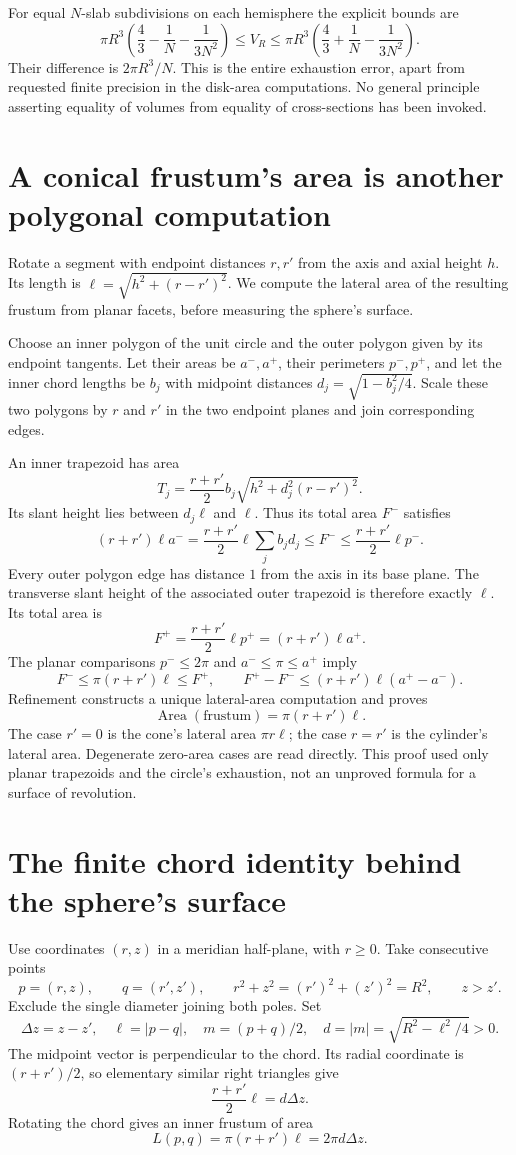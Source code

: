 For equal $N$-slab subdivisions on each hemisphere the explicit bounds are
\[
 \pi R^3\left(\frac43-\frac1N-\frac1{3N^2}\right)
 \le V_R\le
 \pi R^3\left(\frac43+\frac1N-\frac1{3N^2}\right).
\]
Their difference is $2\pi R^3/N$.  This is the entire exhaustion error,
apart from requested finite precision in the disk-area computations.
No general principle asserting equality of volumes from equality of
cross-sections has been invoked.

\section{A conical frustum's area is another polygonal computation}
\label{lem:frustum-area}
Rotate a segment with endpoint distances $r,r'$ from the axis and axial
height $h$.  Its length is $\ell=\sqrt{h^2+(r-r')^2}$.
We compute the lateral area of the resulting frustum from planar facets,
before measuring the sphere's surface.

Choose an inner polygon of the unit circle and the outer polygon given by
its endpoint tangents.  Let their areas be $a^-,a^+$, their perimeters
$p^-,p^+$, and let the inner chord lengths be $b_j$ with midpoint
distances $d_j=\sqrt{1-b_j^2/4}$.  Scale these two polygons by $r$ and
$r'$ in the two endpoint planes and join corresponding edges.

An inner trapezoid has area
\[
 T_j=\frac{r+r'}2 b_j\sqrt{h^2+d_j^2(r-r')^2}.
\]
Its slant height lies between $d_j\ell$ and $\ell$.  Thus its total
area $F^-$ satisfies
\[
 (r+r')\ell a^-
 =\frac{r+r'}2\ell\sum_j b_jd_j
 \le F^-\le\frac{r+r'}2\ell p^-.
\]
Every outer polygon edge has distance $1$ from the axis in its base
plane.  The transverse slant height of the associated outer trapezoid is
therefore exactly $\ell$.  Its total area is
\[
 F^+=\frac{r+r'}2\ell p^+=(r+r')\ell a^+.
\]
The planar comparisons $p^-\le2\pi$ and $a^-\le\pi\le a^+$ imply
\[
 F^-\le\pi(r+r')\ell\le F^+,
 \qquad F^+-F^-\le(r+r')\ell(a^+-a^-).
\]
Refinement constructs a unique lateral-area computation and proves
\[
 \boxed{\operatorname{Area}(\text{frustum})=\pi(r+r')\ell.}
\]
The case $r'=0$ is the cone's lateral area $\pi r\ell$; the case $r=r'$
is the cylinder's lateral area.  Degenerate zero-area cases are read
directly.  This proof used only planar trapezoids and the circle's
exhaustion, not an unproved formula for a surface of revolution.

\section{The finite chord identity behind the sphere's surface}
\label{lem:spherical-band-chord}
Use coordinates $(r,z)$ in a meridian half-plane, with $r\ge0$.
Take consecutive points
\[
 p=(r,z),\qquad q=(r',z'),\qquad
 r^2+z^2=(r')^2+(z')^2=R^2,\qquad z>z'.
\]
Exclude the single diameter joining both poles.  Set
\[
 \Delta z=z-z',\quad \ell=|p-q|,\quad
 m=(p+q)/2,\quad d=|m|=\sqrt{R^2-\ell^2/4}>0.
\]
The midpoint vector is perpendicular to the chord.  Its radial coordinate
is $(r+r')/2$, so elementary similar right triangles give
\[
 \frac{r+r'}2\ell=d\Delta z.
\]
Rotating the chord gives an inner frustum of area
\[
 L(p,q)=\pi(r+r')\ell=2\pi d\Delta z.
\]

